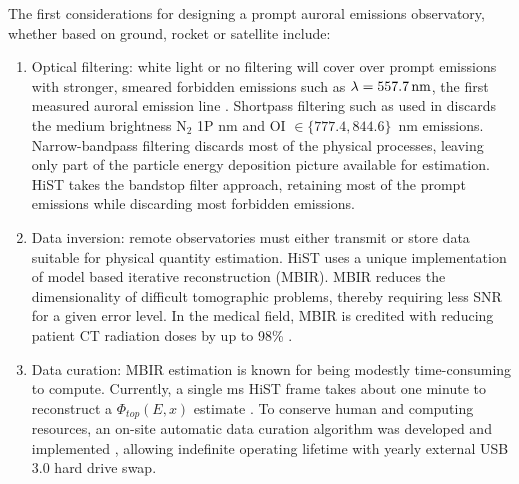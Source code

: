 The first considerations for designing a prompt auroral emissions observatory, whether based on ground, rocket or satellite include:
\begin{enumerate}
    \item Optical filtering: white light or no filtering will cover over prompt emissions with stronger, smeared forbidden emissions such as $\lambda = \unit[557.7]{nm}$, the first measured auroral emission line \citep{angstrom1869}.
    Shortpass filtering such as used in \citet{nishiyama2016} discards the medium brightness N$_2$ 1P \unit[670]{nm} and OI $\in \{777.4, 844.6\}$~nm emissions.
    Narrow-bandpass filtering discards most of the physical processes, leaving only part of the particle energy deposition picture available for estimation.
    HiST takes the bandstop filter approach, retaining most of the prompt emissions while discarding most forbidden emissions.
    \item Data inversion: remote observatories must either transmit or store data suitable for physical quantity estimation. HiST uses a unique implementation of model based iterative reconstruction (MBIR).
    MBIR reduces the dimensionality of difficult tomographic problems, thereby requiring less SNR for a given error level.
    In the medical field, MBIR is credited with reducing patient CT radiation doses by up to 98\% \citep{liu2014}.
    \item Data curation: MBIR estimation is known for being modestly time-consuming to compute.
    Currently, a single \unit[20]{ms} HiST frame takes about one minute to reconstruct a $\Phi_{top}(E,x)$ estimate \citep{hirsch2016}.
    To conserve human and computing resources, an on-site automatic data curation algorithm \citep{cviono} was developed and implemented \citep{hirsch2016bigdata}, allowing indefinite operating lifetime with yearly external USB 3.0 hard drive swap.
\end{enumerate}

